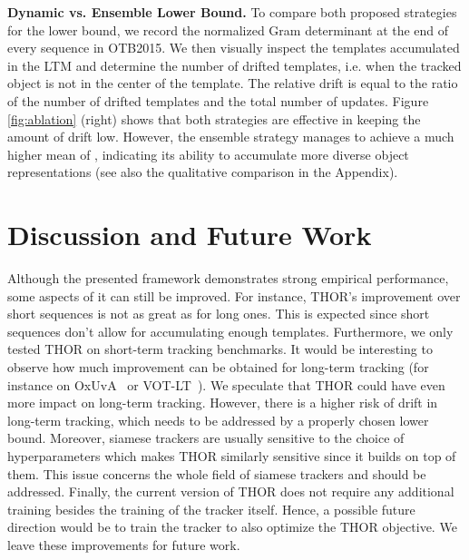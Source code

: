 \documentclass{article}
\begin{document}
\textbf{Dynamic vs. Ensemble Lower Bound.}
To compare both proposed strategies for the lower bound, we record the normalized Gram determinant  at the end of every sequence in OTB2015. We then visually inspect the templates accumulated in the LTM and determine the number of drifted templates, i.e. when the tracked object is not in the center of the template. The relative drift is equal to the ratio of the number of drifted templates and the total number of updates. Figure \ref{fig:ablation} (right) shows that both strategies are effective in keeping the amount of drift low. However, the ensemble strategy manages to achieve a much higher mean of , indicating its ability to accumulate more diverse object representations (see also the qualitative comparison in the Appendix).

\section{Discussion and Future Work}
Although the presented framework demonstrates strong empirical performance, some aspects of it can still be improved. For instance, THOR's improvement over short sequences is not as great as for long ones.  This is expected since short sequences don't allow for accumulating enough templates. 
Furthermore, we only tested THOR on short-term tracking benchmarks. It would be interesting to observe how much improvement can be obtained for long-term tracking (for instance on OxUvA~\cite{valmadre2018long} or VOT-LT~\cite{VOT_TPAMI}). We speculate that THOR could have even more impact on long-term tracking. However, there is a higher risk of drift in long-term tracking, which needs to be addressed by a properly chosen lower bound. 
Moreover, siamese trackers are usually sensitive to the choice of hyperparameters which makes THOR similarly sensitive since it builds on top of them. This issue concerns the whole field of siamese trackers and should be addressed. 
Finally, the current version of THOR does not require any additional training besides the training of the tracker itself. Hence, a possible future direction would be to train the tracker to also optimize the THOR objective. We leave these improvements for future work.
\end{document}
